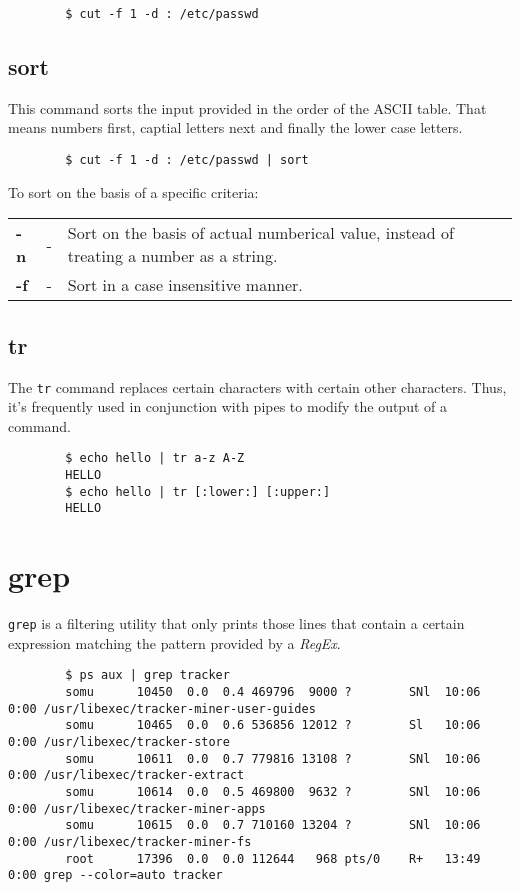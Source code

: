 \documentclass{report}
\begin{document}
	\begin{verbatim}
		$ cut -f 1 -d : /etc/passwd
	\end{verbatim}
	
	\subsection{sort}
	This command sorts the input provided in the order of the ASCII table. That means numbers first, captial letters next and finally the lower case letters. 
	
	\begin{verbatim}
		$ cut -f 1 -d : /etc/passwd | sort
	\end{verbatim}
	
	\noindent
	To sort on the basis of a specific criteria:
	
	\begin{tabular}{lcp{}}
		\textbf{-n} &- &Sort on the basis of actual numberical value, instead of treating a number as a string. \\
		\textbf{-f} &- &Sort in a case insensitive manner. \\
	\end{tabular}

	\subsection{tr}
	The \verb|tr| command replaces certain characters with certain other characters. Thus, it's frequently used in conjunction with pipes to modify the output of a command. 
	
	\begin{verbatim}
		$ echo hello | tr a-z A-Z
		HELLO
		$ echo hello | tr [:lower:] [:upper:]
		HELLO
	\end{verbatim}
	
	\section{grep}
	\verb|grep| is a filtering utility that only prints those lines that contain a certain expression matching the pattern provided by a \textit{RegEx}.
	
	\begin{verbatim}
		$ ps aux | grep tracker
		somu      10450  0.0  0.4 469796  9000 ?        SNl  10:06   0:00 /usr/libexec/tracker-miner-user-guides
		somu      10465  0.0  0.6 536856 12012 ?        Sl   10:06   0:00 /usr/libexec/tracker-store
		somu      10611  0.0  0.7 779816 13108 ?        SNl  10:06   0:00 /usr/libexec/tracker-extract
		somu      10614  0.0  0.5 469800  9632 ?        SNl  10:06   0:00 /usr/libexec/tracker-miner-apps
		somu      10615  0.0  0.7 710160 13204 ?        SNl  10:06   0:00 /usr/libexec/tracker-miner-fs
		root      17396  0.0  0.0 112644   968 pts/0    R+   13:49   0:00 grep --color=auto tracker
	\end{verbatim}
	
\end{document}
